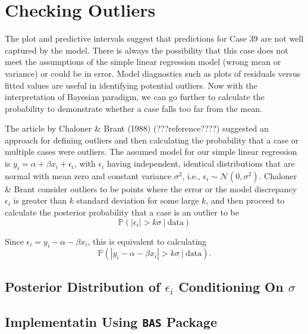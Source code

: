 \documentclass[]{book}
\theoremstyle{definition}
\theoremstyle{definition}
\theoremstyle{definition}
\theoremstyle{remark}
\begin{document}
\section{Checking Outliers}\label{checking-outliers}

The plot and predictive intervals suggest that predictions for Case 39
are not well captured by the model. There is always the possibility that
this case does not meet the assumptions of the simple linear regression
model (wrong mean or variance) or could be in error. Model diagnostics
such as plots of residuals versus fitted values are useful in
identifying potential outliers. Now with the interpretation of Bayesian
paradigm, we can go further to calculate the probability to demonstrate
whether a case falls too far from the mean.

The article by Chaloner \& Brant (1988) (???reference????) suggested an
approach for defining outliers and then calculating the probability that
a case or multiple cases were outliers. The assumed model for our simple
linear regression is \(y_i=\alpha + \beta x_i+\epsilon_i\), with
\(\epsilon_i\) having independent, identical distributions that are
normal with mean zero and constant variance \(\sigma^2\), i.e.,
\(\epsilon_i \sim \mathcal{N}(0, \sigma^2)\). Chaloner \& Brant consider
outliers to be points where the error or the model discrepancy
\(\epsilon_i\) is greater than \(k\) standard deviation for some large
\(k\), and then proceed to calculate the posterior probability that a
case is an outlier to be
\[ \mathbb{P}(|\epsilon_i| > k\sigma ~|~\text{data}) \]

Since \(\epsilon_i = y_i - \alpha-\beta x_i\), this is equivalent to
calculating
\[ \mathbb{P}(|y_i-\alpha-\beta x_i| > k\sigma~|~\text{data}).\]

\subsection{\texorpdfstring{Posterior Distribution of \(\epsilon_i\)
Conditioning On
\(\sigma\)}{Posterior Distribution of \textbackslash{}epsilon\_i Conditioning On \textbackslash{}sigma}}\label{posterior-distribution-of-epsilon_i-conditioning-on-sigma}

\subsection{\texorpdfstring{Implementatin Using \texttt{BAS}
Package}{Implementatin Using BAS Package}}\label{implementatin-using-bas-package}
\end{document}
